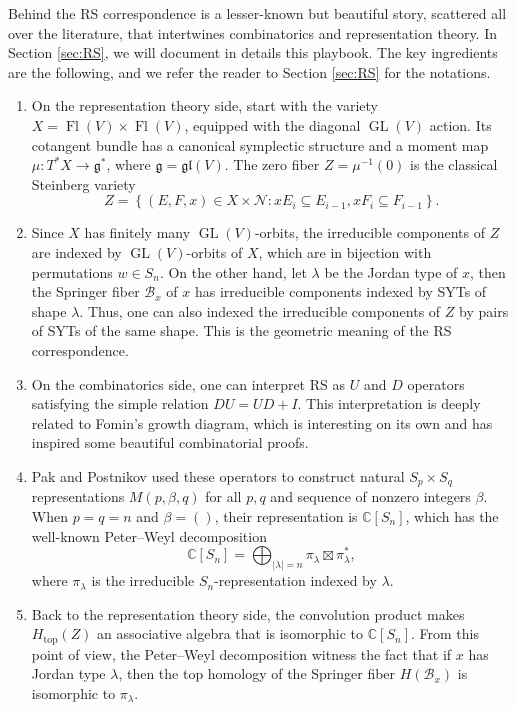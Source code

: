 \documentclass[12pt,a4paper]{article}
\def\Fl{\operatorname{Fl}}
\def\GL{\operatorname{GL}}
\def\FlVV{\Fl(V) \times \Fl(V)}
\theoremstyle{plain}
\theoremstyle{definition}
\theoremstyle{remark}
\newcommand{\cB}{\mathcal{B}}
\newcommand{\cN}{\mathcal{N}}
\newcommand{\CC}{\mathbb{C}}
\def\gfrak{\mathfrak{g}}
\begin{document}
    Behind the RS correspondence is a lesser-known but beautiful story, scattered all over the literature, that intertwines combinatorics and representation theory. In Section \ref{sec:RS}, we will document in details this playbook. The key ingredients are the following, and we refer the reader to Section \ref{sec:RS} for the notations.

    \begin{enumerate}
        \item On the representation theory side, start with the variety $X = \FlVV$, equipped with the diagonal $\GL(V)$ action. Its cotangent bundle has a canonical symplectic structure and a moment map $\mu: T^*X \rightarrow \gfrak^*$, where $\gfrak = \mathfrak{gl}(V)$. The zero fiber $Z = \mu^{-1}(0)$ is the classical Steinberg variety
        \[
        Z= \left\{(E,F,x)\in X \times\cN: xE_i \subseteq E_{i-1}, xF_i\subseteq F_{i-1}\right\}.
        \]
        \item Since $X$ has finitely many $\GL(V)$-orbits, the irreducible components of $Z$ are indexed by $\GL(V)$-orbits of $X$, which are in bijection with permutations $w\in S_n$. On the other hand, let $\lambda$ be the Jordan type of $x$, then the Springer fiber $\cB_x$ of $x$ has irreducible components indexed by SYTs of shape $\lambda$. Thus, one can also indexed the irreducible components of $Z$ by pairs of SYTs of the same shape. This is the geometric meaning of the RS correspondence.
        \item On the combinatorics side, one can interpret RS as $U$ and $D$ operators satisfying the simple relation $DU = UD + I$. This interpretation is deeply related to Fomin's growth diagram, which is interesting on its own and has inspired some beautiful combinatorial proofs.
        \item Pak and Postnikov used these operators to construct natural $S_p\times S_q$ representations $M(p,\beta,q)$ for all $p,q$ and sequence of nonzero integers $\beta$. When $p = q = n$ and $\beta = ()$, their representation is $\CC[S_n]$, which has the well-known Peter--Weyl decomposition
        \[
        \CC[S_n] = \bigoplus_{|\lambda| = n}\pi_\lambda \boxtimes \pi^*_\lambda,
        \]
        where $\pi_\lambda$ is the irreducible $S_n$-representation indexed by $\lambda$.
        \item Back to the representation theory side, the convolution product makes $H_{\operatorname{top}}(Z)$ an associative algebra that is isomorphic to $\CC[S_n]$. From this point of view, the Peter--Weyl decomposition witness the fact that if $x$ has Jordan type $\lambda$, then the top homology of the Springer fiber $H(\cB_x)$ is isomorphic to $\pi_\lambda$.
    \end{enumerate}
\end{document}

